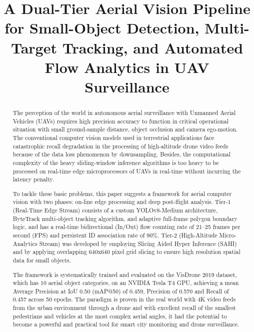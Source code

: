 \documentclass[conference]{IEEEtran}
\begin{document}
\title{A Dual-Tier Aerial Vision Pipeline for Small-Object Detection, Multi-Target Tracking, and Automated Flow Analytics in UAV Surveillance}

\author{
}

\maketitle

\begin{abstract}
The perception of the world in autonomous aerial surveillance with Unmanned Aerial Vehicles (UAVs) requires high precision accuracy to function in critical operational situation with small ground-sample distance, object occlusion and camera ego-motion. The conventional computer vision models used in terrestrial applications face catastrophic recall degradation in the processing of high-altitude drone video feeds because of the data loss phenomenon by downsampling. Besides, the computational complexity of the heavy sliding-window inference algorithms is too heavy to be processed on real-time edge microprocessors of UAVs in real-time without incurring the latency penalty. 

To tackle these basic problems, this paper suggests a framework for aerial computer vision with two phases: on-line edge processing and deep post-flight analysis. Tier-1 (Real-Time Edge Stream) consists of a custom YOLOv8-Medium architecture, ByteTrack multi-object tracking algorithm, and adaptive full-frame polygon boundary logic, and has a real-time bidirectional (In/Out) flow counting rate of 21--25 frames per second (FPS) and persistent ID association rate of 90\%. Tier-2 (High-Altitude Micro-Analytics Stream) was developed by employing Slicing Aided Hyper Inference (SAHI) and by applying overlapping 640x640 pixel grid slicing to ensure high resolution spatial data for small objects. 

The framework is systematically trained and evaluated on the VisDrone 2019 dataset, which has 10 aerial object categories, on an NVIDIA Tesla T4 GPU, achieving a mean Average Precision at IoU 0.50 (mAP@50) of 0.459, Precision of 0.570 and Recall of 0.457 across 50 epochs. The paradigm is proven in the real world with 4K video feeds from the urban environment through a drone and with excellent recall of the smallest pedestrians and vehicles at the most complex aerial angles, it had the potential to become a powerful and practical tool for smart city monitoring and drone surveillance.
\end{abstract}
\end{document}
